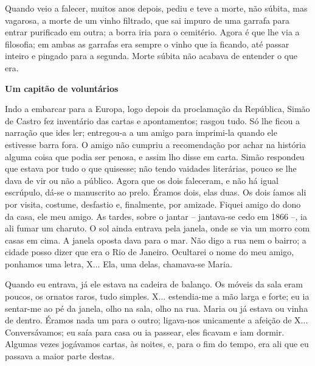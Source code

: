 Quando veio a falecer, muitos anos depois, pediu e teve a morte, não
súbita, mas vagarosa, a morte de um vinho filtrado, que sai impuro de
uma garrafa para entrar purificado em outra; a borra iria para o
cemitério. Agora é que lhe via a filosofia; em ambas as garrafas era
sempre o vinho que ia ficando, até passar inteiro e pingado para a
segunda. Morte súbita não acabava de entender o que era.

\textbf{Um capitão de voluntários}

Indo a embarcar para a Europa, logo depois da proclamação da República,
Simão de Castro fez inventário das cartas e apontamentos; rasgou tudo.
Só lhe ficou a narração que ides ler; entregou-a a um amigo para
imprimi-la quando ele estivesse barra fora. O amigo não cumpriu a
recomendação por achar na história alguma coisa que podia ser penosa, e
assim lho disse em carta. Simão respondeu que estava por tudo o que
quisesse; não tendo vaidades literárias, pouco se lhe dava de vir ou não
a público. Agora que os dois faleceram, e não há igual escrúpulo, dá-se
o manuscrito ao prelo. Éramos dois, elas duas. Os dois íamos ali por
visita, costume, desfastio e, finalmente, por amizade. Fiquei amigo do
dono da casa, ele meu amigo. As tardes, sobre o jantar -- jantava-se
cedo em 1866 --, ia ali fumar um charuto. O sol ainda entrava pela
janela, onde se via um morro com casas em cima. A janela oposta dava
para o mar. Não digo a rua nem o bairro; a cidade posso dizer que era o
Rio de Janeiro. Ocultarei o nome do meu amigo, ponhamos uma letra, X...
Ela, uma delas, chamava-se Maria.

Quando eu entrava, já ele estava na cadeira de balanço. Os móveis da
sala eram poucos, os ornatos raros, tudo simples. X... estendia-me a mão
larga e forte; eu ia sentar-me ao pé da janela, olho na sala, olho na
rua. Maria ou já estava ou vinha de dentro. Éramos nada um para o outro;
ligava-nos unicamente a afeição de X... Conversávamos; eu saía para casa
ou ia passear, eles ficavam e iam dormir. Algumas vezes jogávamos
cartas, às noites, e, para o fim do tempo, era ali que eu passava a
maior parte destas.

